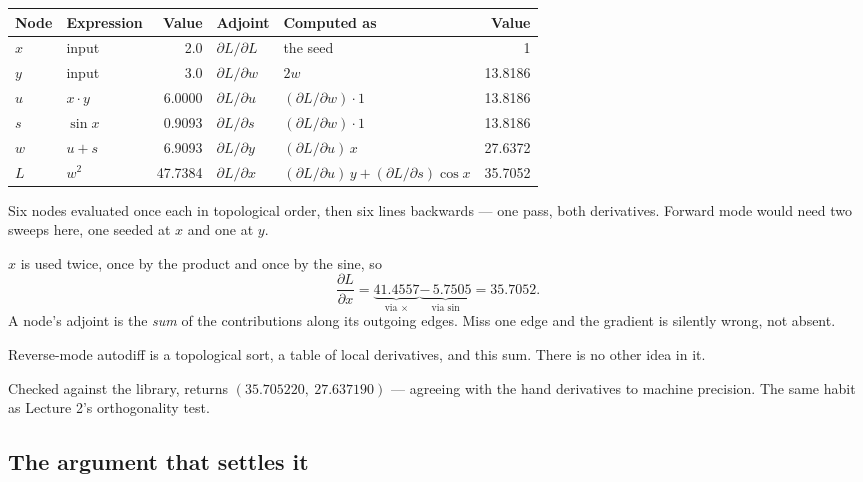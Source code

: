 \documentclass[11pt,a4paper]{article}
\begin{document}
\begin{center}
\small
\begin{tabular}{llr@{\hskip 2.2em}llr}
\toprule
\textbf{Node} & \textbf{Expression} & \textbf{Value} &
\textbf{Adjoint} & \textbf{Computed as} & \textbf{Value} \\
\midrule
$x$ & input      & 2.0    & $\partial L/\partial L$ & the seed & 1 \\
$y$ & input      & 3.0    & $\partial L/\partial w$ & $2w$ & 13.8186 \\
$u$ & $x\cdot y$ & 6.0000 & $\partial L/\partial u$ & $(\partial L/\partial w)\cdot 1$ & 13.8186 \\
$s$ & $\sin x$   & 0.9093 & $\partial L/\partial s$ & $(\partial L/\partial w)\cdot 1$ & 13.8186 \\
$w$ & $u + s$    & 6.9093 & $\partial L/\partial y$ & $(\partial L/\partial u)\,x$ & 27.6372 \\
$L$ & $w^2$      & 47.7384 & $\partial L/\partial x$ & $(\partial L/\partial u)\,y + (\partial L/\partial s)\cos x$ & 35.7052 \\
\bottomrule
\end{tabular}
\end{center}

Six nodes evaluated once each in topological order, then six lines backwards
--- one pass, both derivatives. Forward mode would need two sweeps here, one
seeded at $x$ and one at $y$.

\begin{keybox}[title={The only bookkeeping in the whole method}]
$x$ is used twice, once by the product and once by the sine, so
\[ \frac{\partial L}{\partial x}
   = \underbrace{41.4557}_{\text{via }\times}
     \underbrace{-\,5.7505}_{\text{via }\sin}
   = 35.7052. \]
A node's adjoint is the \emph{sum} of the contributions along its outgoing
edges. Miss one edge and the gradient is silently wrong, not absent.

Reverse-mode autodiff is a topological sort, a table of local derivatives, and
this sum. There is no other idea in it.
\end{keybox}

Checked against the library,  returns
$(35.705220,\ 27.637190)$ --- agreeing with the hand derivatives to machine
precision. The same habit as Lecture 2's orthogonality test.

\subsection{The argument that settles it}
\end{document}
